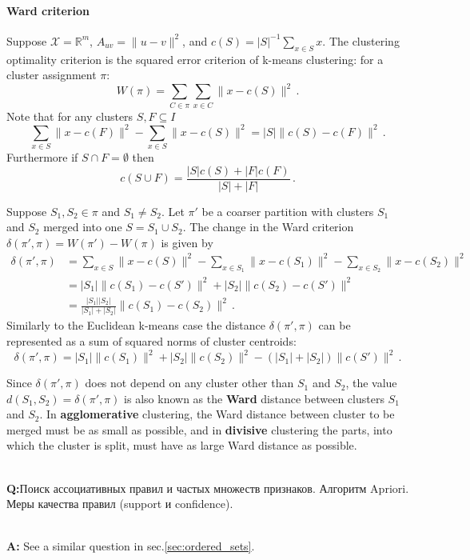 \documentclass[a4paper]{article}
\newcommand{\Real}{\mathbb{R}}
\newcommand{\rus}[1]{\foreignlanguage{russian}{#1}}
\begin{document}
\paragraph{Ward criterion} %
\label{par:ward_criterion}

Suppose $\mathcal{X} = \Real^m$, $A_{uv} = \|u-v\|^2$, and $c(S) = |S|^{-1} \sum_{x\in S} x$.
The clustering optimality criterion is the squared error criterion of k-means clustering:
for a cluster assignment $\pi$:
$$ W(\pi) = \sum_{C\in \pi} \sum_{x\in C} \|x - c(S)\|^2 \,. $$
Note that for any clusters $S, F\subseteq I$
$$ \sum_{x\in S} \|x - c(F)\|^2 - \sum_{x \in S} \|x - c(S)\|^2
    = |S| \|c(S) - c(F)\|^2 \,. $$
Furthermore if $S \cap F =\emptyset$ then
$$ c(S\cup F) = \frac{|S| c(S) + |F| c(F)}{|S|+|F|} \,. $$

Suppose $S_1, S_2\in \pi$ and $S_1\neq S_2$. Let $\pi'$ be a coarser partition with
clusters $S_1$ and $S_2$ merged into one $S = S_1\cup S_2$. The change in the Ward
criterion $\delta(\pi',\pi) = W(\pi') - W(\pi)$ is given by
\begin{align*}
    \delta(\pi',\pi)
    &= \sum_{x\in S} \|x - c(S)\|^2 - \sum_{x\in S_1} \|x - c(S_1)\|^2
     - \sum_{x\in S_2} \|x - c(S_2)\|^2\\
    &= |S_1| \|c(S_1) - c(S')\|^2 + |S_2| \|c(S_2) - c(S')\|^2 \\
    &= \frac{|S_1| |S_2|}{|S_1| + |S_2|} \|c(S_1) - c(S_2)\|^2 \,.
\end{align*}
Similarly to the Euclidean k-means case the distance $\delta(\pi',\pi)$ can be represented
as a sum of squared norms of cluster centroids:
$$ \delta(\pi',\pi)
    = |S_1|\|c(S_1)\|^2 + |S_2|\|c(S_2)\|^2
    - (|S_1|+|S_2|)\|c(S')\|^2
    \,. $$

Since $\delta(\pi',\pi)$ does not depend on any cluster other than $S_1$ and $S_2$, the
value $d(S_1, S_2) = \delta(\pi',\pi)$ is also known as the \textbf{Ward} distance between
clusters $S_1$ and $S_2$. In \textbf{agglomerative} clustering, the Ward distance between
cluster to be merged must be as small as possible, and in \textbf{divisive} clustering
the parts, into which the cluster is split, must have as large Ward distance as possible.


\hfill\\\textbf{Q:}\rus{Поиск ассоциативных правил и частых множеств признаков.
Алгоритм Apriori. Меры качества правил (support и confidence).}

\hfill\\\textbf{A:}
See a similar question in sec.\ref{sec:ordered_sets}.
\end{document}
